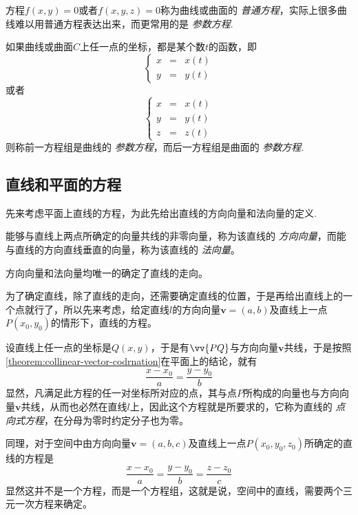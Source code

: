 方程$f(x,y)=0$或者$f(x,y,z)=0$称为曲线或曲面的 \emph{普通方程}，实际上很多曲线难以用普通方程表达出来，而更常用的是 \emph{参数方程}.

\begin{definition}
  如果曲线或曲面$C$上任一点的坐标，都是某个数$t$的函数，即
  \[ \left\{
      \begin{array}{lll}
        x & = & x(t) \\
        y & = & y(t)
      \end{array}
    \right. \]
  或者
  \[ \left\{
      \begin{array}{lll}
        x & = & x(t) \\
        y & = & y(t) \\
        z & = & z(t)
      \end{array}
    \right. \]
  则称前一方程组是曲线的 \emph{参数方程}，而后一方程组是曲面的 \emph{参数方程}.
\end{definition}

\subsection{直线和平面的方程}
\label{sec:equation-of-line-and-plane}

先来考虑平面上直线的方程，为此先给出直线的方向向量和法向量的定义.

\begin{definition}
  能够与直线上两点所确定的向量共线的非零向量，称为该直线的 \emph{方向向量}，而能与直线的方向直线垂直的向量，称为该直线的 \emph{法向量}。
\end{definition}

方向向量和法向量均唯一的确定了直线的走向。

为了确定直线，除了直线的走向，还需要确定直线的位置，于是再给出直线上的一个点就行了，所以先来考虑，给定直线$l$的方向向量$\bm{v}=(a,b)$及直线上一点$P(x_0,y_0)$的情形下，直线的方程。

设直线上任一点的坐标是$Q(x,y)$，于是有$\vv{PQ}$与方向向量$\bm{v}$共线，于是按照\autoref{theorem:collinear-vector-codrnation}在平面上的结论，就有
\[ \frac{x-x_0}{a} = \frac{y-y_0}{b} \]
显然，凡满足此方程的任一对坐标所对应的点，其与点$P$所构成的向量也与方向向量$\bm{v}$共线，从而也必然在直线$l$上，因此这个方程就是所要求的，它称为直线的 \emph{点向式方程}，在分母为零时约定分子也为零。

同理，对于空间中由方向向量$\bm{v}=(a,b,c)$及直线上一点$P(x_0,y_0,z_0)$所确定的直线的方程是
\[ \frac{x-x_0}{a} = \frac{y-y_0}{b} = \frac{z-z_0}{c} \]
显然这并不是一个方程，而是一个方程组，这就是说，空间中的直线，需要两个三元一次方程来确定。

